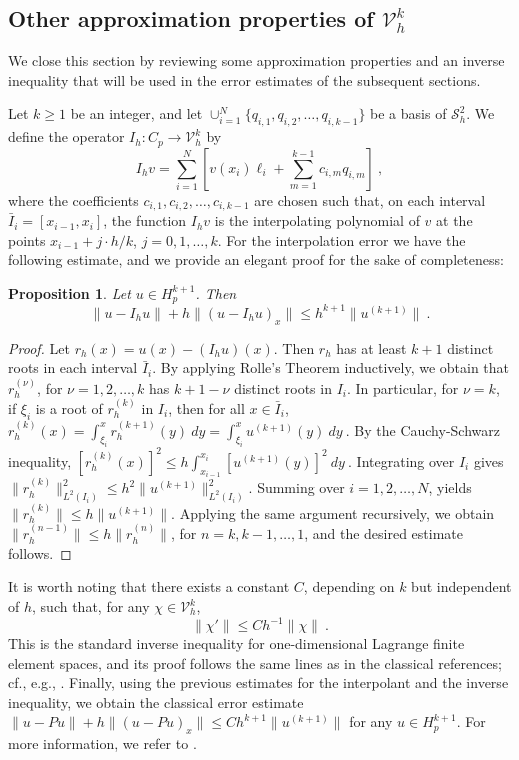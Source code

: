 \documentclass{amsart}
\newtheorem{proposition}{Proposition}[section]
\begin{document}
\subsection{Other approximation properties of $\mathcal{V}_h^k$}

We close this section by reviewing some approximation properties and an inverse inequality that will be used in the error estimates of the subsequent sections.

Let $k\geq 1$ be an integer, and let $\cup_{i=1}^{N}\{q_{i,1},q_{i,2},\dots, q_{i,k-1}\}$ be a basis of $\mathcal{S}_h^2$. We define the operator $I_h:C_p\to \mathcal{V}_h^k$ by 
$$I_hv=\sum_{i=1}^N\left[v(x_i)\ell_i+\sum_{m=1}^{k-1} c_{i,m} q_{i,m} \right]\ ,$$
where the coefficients $c_{i,1},c_{i,2},\dots,c_{i,k-1}$ are chosen such that, on each interval $\bar{I}_i=[x_{i-1},x_i]$, the function $I_h v$ is the interpolating polynomial of $v$ at the points $x_{i-1}+j\cdot h/k$, $j=0,1,\dots,k$. 
%
For the interpolation error we have the following estimate, and we provide an elegant proof for the sake of completeness:
%
\begin{proposition}
Let $u\in H_p^{k+1}$. Then
\begin{equation}\label{eq:appropro}
    \|u-I_h u\|+h\|(u-I_hu)_x\|\leq h^{k+1}\|u^{(k+1)}\|\ .
\end{equation}
\end{proposition}
\begin{proof}
Let $r_h(x)=u(x)-(I_hu)(x)$. Then $r_h$ has at least $k+1$ distinct roots in each interval $\bar{I}_i$. By applying Rolle's Theorem inductively, we obtain that $r_h^{(\nu)}$, for $\nu=1,2,\dots,k$ has $k+1-\nu$ distinct roots in $I_i$. In particular, for $\nu=k$, if $\xi_i$ is a root of $r_h^{(k)}$ in $I_i$, then for all $x\in\bar{I}_i$,
 $r_h^{(k)}(x)=\int_{\xi_i}^x r_h^{(k+1)}(y)~dy=\int_{\xi_i}^x u^{(k+1)}(y)~dy\ .$
By the Cauchy-Schwarz inequality,
$[r_h^{(k)}(x)]^2\leq h\int_{x_{i-1}}^{x_i}[u^{(k+1)}(y)]^2~dy\ .$ 
Integrating over $I_i$ gives $\|r_h^{(k)}\|^2_{L^2(I_i)}\leq h^2\|u^{(k+1)}\|^2_{L^2(I_i)}$.
Summing over $i=1,2,\dots, N$, yields $\|r_h^{(k)}\|\leq h\|u^{(k+1)}\|$.
Applying the same argument recursively, we obtain $\|r_h^{(n-1)}\|\leq h\|r_h^{(n)}\|$, for $n=k,k-1,\dots,1$, and the desired estimate follows.
\end{proof}
%
It is worth noting that there exists a constant $C$, depending on $k$ but independent of $h$, such that, for any $\chi\in\mathcal{V}_h^k$, 
%
\begin{equation}\label{eq:inverse}
\|\chi'\|\leq Ch^{-1}\|\chi\|\ .
\end{equation}
%
This is the standard inverse inequality for one-dimensional Lagrange finite element spaces, and its proof follows the same lines as in the classical references; cf., e.g., \cite{EG2004}.
%
Finally, using the previous estimates for the interpolant and the inverse inequality, we obtain the classical error estimate $\|u-Pu\|+h\|(u-Pu)_x\|\leq C h^{k+1}\|u^{(k+1)}\|$ for any $u\in H_p^{k+1}$. For more information, we refer to \cite{EG2004}.
\end{document}
